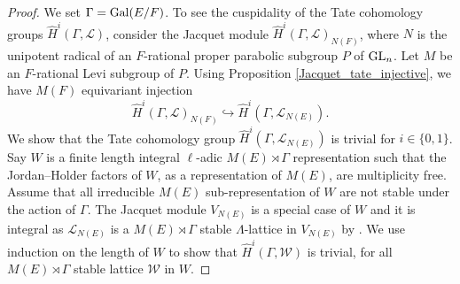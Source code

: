 \documentclass[10pt, reqno]{amsart}
\theoremstyle{plain}
\numberwithin{equation}{section} \newcommand{\di}{\operatorname{dim}}
\begin{document}
\begin{proof}
  We set $\Gamma = {\rm Gal}(E/F)$. To see the cuspidality of the Tate
  cohomology groups $\widehat{H}^i(\Gamma,\mathcal{L})$, consider the
  Jacquet module $\widehat{H}^i(\Gamma,\mathcal{L})_{N(F)}$, where $N$
  is the unipotent radical of an $F$-rational proper parabolic
  subgroup $P$ of ${\rm GL}_n$. Let $M$ be an $F$-rational Levi
  subgroup of $P$. Using Proposition \ref{Jacquet_tate_injective}, we
  have $M(F)$ equivariant injection
$$ \widehat{H}^i(\Gamma, \mathcal{L})_{N(F)} 
\hookrightarrow \widehat{H}^i(\Gamma, \mathcal{L}_{N(E)}). $$ We show
that the Tate cohomology group
$\widehat{H}^i(\Gamma, \mathcal{L}_{N(E)})$ is trivial for
$i\in \{0,1\}$. Say $W$ is a finite length integral $\ell$-adic
$M(E)\rtimes \Gamma$ representation such that the Jordan--Holder
factors of $W$, as a representation of $M(E)$, are multiplicity
free. Assume that all irreducible $M(E)$ sub-representation of $W$ are
not stable under the action of $\Gamma$. The Jacquet module $V_{N(E)}$
is a special case of $W$ and it is integral as $\mathcal{L}_{N(E)}$ is
a $M(E)\rtimes \Gamma$ stable $\Lambda$-lattice in $V_{N(E)}$ by
\cite[Proposition 1.4] {Dat_tempered}.  We use induction on the length
of $W$ to show that $\widehat{H}^i(\Gamma, \mathcal{W})$ is trivial,
for all $M(E)\rtimes \Gamma$ stable lattice $\mathcal{W}$ in $W$.


\end{proof}
\end{document}

